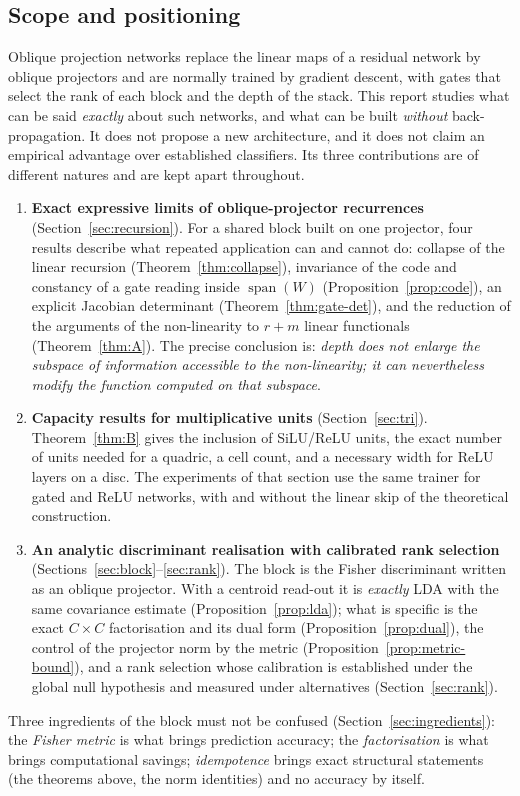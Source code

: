 \documentclass[11pt,a4paper]{article}
\theoremstyle{plain}
\theoremstyle{definition}
\theoremstyle{remark}
\newcommand{\spn}{\operatorname{span}}
\begin{document}
\subsection{Scope and positioning}
Oblique projection networks replace the linear maps of a residual network
by oblique projectors and are normally trained by gradient descent, with
gates that select the rank of each block and the depth of the stack. This
report studies what can be said \emph{exactly} about such networks, and
what can be built \emph{without} back-propagation. It does not propose a
new architecture, and it does not claim an empirical advantage over
established classifiers. Its three contributions are of different natures
and are kept apart throughout.
\begin{enumerate}
  \item \textbf{Exact expressive limits of oblique-projector recurrences}
  (Section~\ref{sec:recursion}). For a shared block built on one projector,
  four results describe what repeated application can and cannot do:
  collapse of the linear recursion (Theorem~\ref{thm:collapse}), invariance
  of the code and constancy of a gate reading inside $\spn(W)$
  (Proposition~\ref{prop:code}), an explicit Jacobian determinant
  (Theorem~\ref{thm:gate-det}), and the reduction of the arguments of the
  non-linearity to $r+m$ linear functionals (Theorem~\ref{thm:A}). The
  precise conclusion is: \emph{depth does not enlarge the subspace of
  information accessible to the non-linearity; it can nevertheless modify
  the function computed on that subspace}.
  \item \textbf{Capacity results for multiplicative units}
  (Section~\ref{sec:tri}). Theorem~\ref{thm:B} gives the inclusion of
  SiLU/ReLU units, the exact number of units needed for a quadric, a cell
  count, and a necessary width for ReLU layers on a disc. The experiments
  of that section use the same trainer for gated and ReLU networks, with
  and without the linear skip of the theoretical construction.
  \item \textbf{An analytic discriminant realisation with calibrated rank
  selection} (Sections~\ref{sec:block}--\ref{sec:rank}). The block is the
  Fisher discriminant written as an oblique projector. With a centroid
  read-out it is \emph{exactly} LDA with the same covariance estimate
  (Proposition~\ref{prop:lda}); what is specific is the exact $C\times C$
  factorisation and its dual form (Proposition~\ref{prop:dual}), the
  control of the projector norm by the metric
  (Proposition~\ref{prop:metric-bound}), and a rank selection whose
  calibration is established under the global null hypothesis and measured
  under alternatives (Section~\ref{sec:rank}).
\end{enumerate}
Three ingredients of the block must not be confused
(Section~\ref{sec:ingredients}): the \emph{Fisher metric} is what brings
prediction accuracy; the \emph{factorisation} is what brings computational
savings; \emph{idempotence} brings exact structural statements (the
theorems above, the norm identities) and no accuracy by itself.
\end{document}
